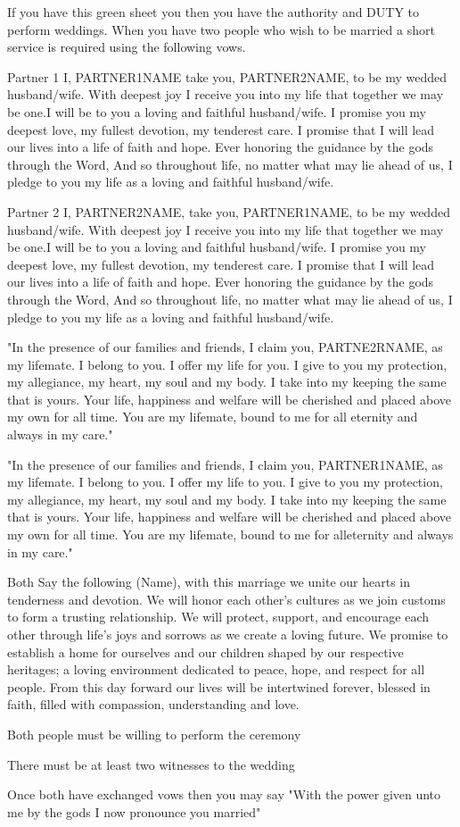 \documentclass[green]{guildcamp3}
\begin{document}
	
	\name{\gWedding{}}
		
	If you have this green sheet you then you have the authority and DUTY to perform weddings. When you have two people who wish to be married a short service is required using the following vows. 
	
	Partner 1
	I, PARTNER1NAME take you, PARTNER2NAME, to be my wedded husband/wife. With deepest joy I receive you into my life that together we may be one.I will be to you a loving and faithful husband/wife. I promise you my deepest love, my fullest devotion, my tenderest care. I promise that I will lead our lives into a life of faith and hope. Ever honoring the guidance by the gods through the Word, And so throughout life, no matter what may lie ahead of us, I pledge to you my life as a loving and faithful husband/wife.
	
	Partner 2
	I, PARTNER2NAME, take you, PARTNER1NAME, to be my wedded husband/wife. With deepest joy I receive you into my life that together we may be one.I will be to you a loving and faithful husband/wife. I promise you my deepest love, my fullest devotion, my tenderest care. I promise that I will lead our lives into a life of faith and hope. Ever honoring the guidance by the gods through the Word, And so throughout life, no matter what may lie ahead of us, I pledge to you my life as a loving and faithful husband/wife.
	
	
	"In the presence of our families and friends, I claim you, PARTNE2RNAME, as my lifemate. I belong to you. I offer my life for you. I give to you my protection, my allegiance, my heart, my soul and my body. I take into my keeping the same that is yours. Your life, happiness and welfare will be cherished and placed above my own for all time. You are my lifemate, bound to me for all eternity and always in my care."
	
	"In the presence of our families and friends, I claim you, PARTNER1NAME, as my lifemate. I belong to you. I offer my life to you. I give to you my protection, my allegiance, my heart, my soul and my body. I take into my keeping the same that is yours. Your life, happiness and welfare will be cherished and placed above my own for all time. You are my lifemate, bound to me for alleternity and always in my care."
	
	Both Say the following
	(Name), with this marriage we unite our hearts in tenderness and devotion. We will honor each other's cultures as we join customs to form a trusting relationship. We will protect, support, and encourage each other through life's joys and sorrows as we create a loving future. We promise to establish a home for ourselves and our children shaped by our respective heritages; a loving environment dedicated to peace, hope, and respect for all people. From this day forward our lives will be intertwined forever, blessed in faith, filled with compassion, understanding and love.
	
	
	
	
	\begin{enum}[Directions]
		\item Both people must be willing to perform the ceremony
		\item There must be at least two witnesses to the wedding 
		\item Once both have exchanged vows then you may say "With the power given unto me by the gods I now pronounce you married"

	\end{enum}
	
	
\end{document}

